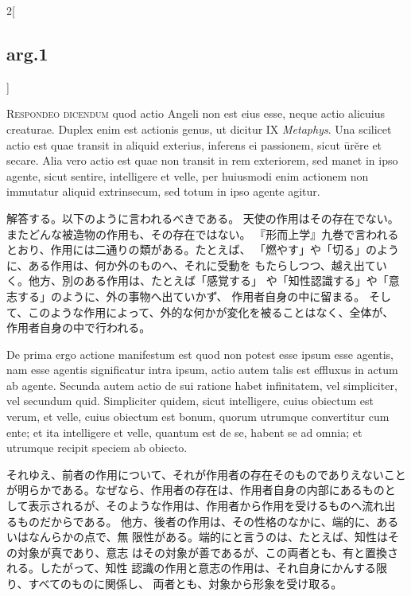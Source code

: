 \documentclass[paper=a4paper,fontsize=10pt,jafontsize=9pt,titlepage]{jlreq}
\begin{document}
\begin{paracol}{2}[\subsection{arg.1}]

{\scshape Respondeo dicendum} quod actio Angeli non est
eius esse, neque actio alicuius creaturae. Duplex enim est actionis
genus, ut dicitur IX {\itshape Metaphys}. Una scilicet actio est quae transit in
aliquid exterius, inferens ei passionem, sicut \={u}r\u{e}re et secare. Alia
vero actio est quae non transit in rem exteriorem, sed manet in ipso
agente, sicut sentire, intelligere et velle, per huiusmodi enim actionem
non immutatur aliquid extrinsecum, sed totum in ipso agente agitur.

\switchcolumn

解答する。以下のように言われるべきである。
天使の作用はその存在でない。またどんな被造物の作用も、その存在ではない。
『形而上学』九巻で言われるとおり、作用には二通りの類がある。たとえば、
 「燃やす」や「切る」のように、ある作用は、何か外のものへ、それに受動を
 もたらしつつ、越え出ていく。他方、別のある作用は、たとえば「感覚する」
 や「知性認識する」や「意志する」のように、外の事物へ出ていかず、
 作用者自身の中に留まる。
そして、このような作用によって、外的な何かが変化を被ることはなく、全体が、
 作用者自身の中で行われる。

\switchcolumn*

De
prima ergo actione manifestum est quod non potest esse ipsum esse
agentis, nam esse agentis significatur intra ipsum, actio autem talis
est effluxus in actum ab agente. 
Secunda autem actio de sui ratione
habet infinitatem, vel simpliciter, vel secundum quid. Simpliciter
quidem, sicut intelligere, cuius obiectum est verum, et velle, cuius
obiectum est bonum, quorum utrumque convertitur cum ente; et ita
intelligere et velle, quantum est de se, habent se ad omnia; et utrumque
recipit speciem ab obiecto.

\switchcolumn

それゆえ、前者の作用について、それが作用者の存在そのものでありえないこと
 が明らかである。なぜなら、作用者の存在は、作用者自身の内部にあるものと
 して表示されるが、そのような作用は、作用者から作用を受けるものへ流れ出
 るものだからである。
他方、後者の作用は、その性格のなかに、端的に、あるいはなんらかの点で、無
 限性がある。端的にと言うのは、たとえば、知性はその対象が真であり、意志
 はその対象が善であるが、この両者とも、有と置換される。したがって、知性
 認識の作用と意志の作用は、それ自身にかんする限り、すべてのものに関係し、
 両者とも、対象から形象を受け取る。


\end{paracol}
\end{document}
